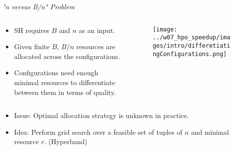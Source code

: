 \begin{frame}{\emph{"n versus B/n" Problem}}
\begin{columns}

\begin{column}{.45\linewidth}
\begin{itemize}
    \item SH requires $B$ and $n$ as an input.
    \item Given finite $B$, $B/n$ resources are allocated across the configurations.
    \item Configurations need enough minimal resources to differentiate between them in terms of quality.
\end{itemize}
\end{column}

\begin{column}{.45\linewidth}

\begin{figure}
    \centering
    \vspace{2em}
    \texttt{[image: ../w07\_hpo\_speedup/images/intro/differetiatingConfigurations.png]}
\end{figure}
\end{column}
\end{columns}

\vspace{-6.5em}
\begin{columns}

\begin{column}{.45\linewidth}
\begin{itemize}

    \item Issue: Optimal allocation strategy is unknown in practice.
    \item Idea: Perform grid search over a feasible set of tuples of $n$ and minimal resource $r$. (Hyperband) 
\end{itemize}
\end{column}

\begin{column}{.45\linewidth}

\end{column}
    
\end{columns}
    
\end{frame}

